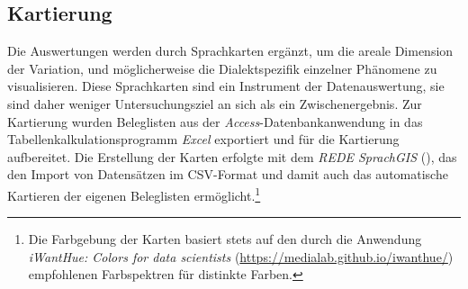 \subsection{Kartierung}
\label{sec:6.3.2}
Die Auswertungen werden durch Sprachkarten ergänzt, um die areale Dimension der Variation, und möglicherweise die Dialektspezifik einzelner Phänomene zu visualisieren. Diese Sprachkarten sind ein Instrument der Datenauswertung, sie sind daher weniger Untersuchungsziel an sich als ein Zwischenergebnis. Zur Kartierung wurden Beleglisten aus der \textit{Access}-Datenbankanwendung in das Tabellenkalkulationsprogramm \textit{Excel} exportiert und für die Kartierung aufbereitet. Die Erstellung der Karten erfolgte mit dem \textit{REDE SprachGIS} (\citealt{SchmidtEtAl2008ff}), das den Import von Datensätzen im CSV-Format und damit auch das automatische Kartieren der eigenen Beleglisten ermöglicht.\footnote{Die Farbgebung der Karten basiert stets auf den durch die Anwendung \textit{iWantHue: Colors for data scientists} (\url{https://medialab.github.io/iwanthue/}) empfohlenen Farbspektren für distinkte Farben.}

